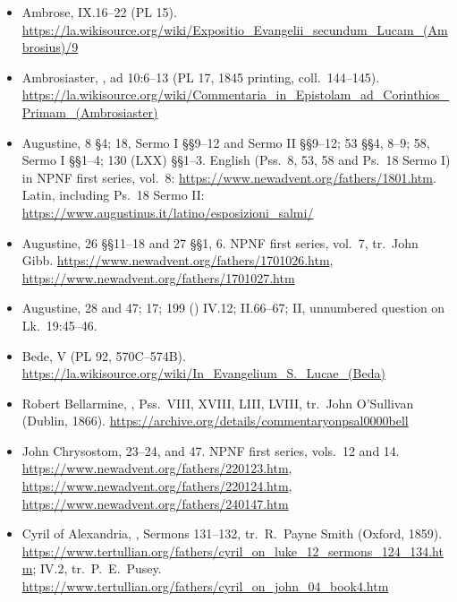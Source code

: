 \begin{itemize}[leftmargin=1.2em, itemsep=0.15em]
\item Ambrose,  IX.16--22 (PL 15).
\url{https://la.wikisource.org/wiki/Expositio_Evangelii_secundum_Lucam_(Ambrosius)/9}
\item Ambrosiaster, , ad
10:6--13 (PL 17, 1845 printing, coll.\ 144--145).
\url{https://la.wikisource.org/wiki/Commentaria_in_Epistolam_ad_Corinthios_Primam_(Ambrosiaster)}
\item Augustine,  8 §4; 18, Sermo I §§9--12 and
Sermo II §§9--12; 53 §§4, 8--9; 58, Sermo I §§1--4; 130 (LXX) §§1--3.
English (Pss.\ 8, 53, 58 and Ps.\ 18 Sermo I) in NPNF first series, vol.~8:
\url{https://www.newadvent.org/fathers/1801.htm}. Latin, including Ps.\ 18
Sermo II: \url{https://www.augustinus.it/latino/esposizioni_salmi/}
\item Augustine,  26 §§11--18 and 27
§§1, 6. NPNF first series, vol.~7, tr.\ John Gibb.
\url{https://www.newadvent.org/fathers/1701026.htm},
\url{https://www.newadvent.org/fathers/1701027.htm}
\item Augustine,  28 and 47;  17;  199 () IV.12;
 II.66--67; 
II, unnumbered question on Lk.\ 19:45--46.
\item Bede,  V (PL 92, 570C--574B).
\url{https://la.wikisource.org/wiki/In_Evangelium_S._Lucae_(Beda)}
\item Robert Bellarmine, , Pss.\ VIII, XVIII,
LIII, LVIII, tr.\ John O'Sullivan (Dublin, 1866).
\url{https://archive.org/details/commentaryonpsal0000bell}
\item John Chrysostom,  23--24, and
 47. NPNF first series, vols.\ 12 and 14.
\url{https://www.newadvent.org/fathers/220123.htm},
\url{https://www.newadvent.org/fathers/220124.htm},
\url{https://www.newadvent.org/fathers/240147.htm}
\item Cyril of Alexandria, , Sermons 131--132, tr.\
R.~Payne Smith (Oxford, 1859).
\url{https://www.tertullian.org/fathers/cyril_on_luke_12_sermons_124_134.htm};
\work{Commentary on John} IV.2, tr.\ P.~E.~Pusey.
\url{https://www.tertullian.org/fathers/cyril_on_john_04_book4.htm}

\end{itemize}
